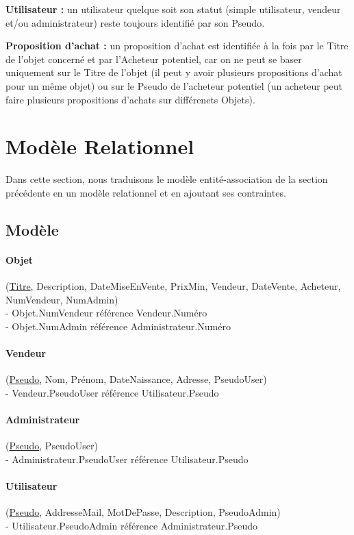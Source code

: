 \documentclass[a4paper,11pt]{article}
\begin{document}
\textbf{Utilisateur :} un utilisateur quelque soit son statut (simple utilisateur, vendeur et/ou administrateur) reste toujours identifié
par son Pseudo.

\textbf{Proposition d'achat :} un proposition d'achat est identifiée à la fois par le Titre de l'objet concerné et par l'Acheteur potentiel,
car on ne peut se baser uniquement sur le Titre de l'objet (il peut y avoir plusieurs propositions d'achat pour un même objet)
ou sur le Pseudo de l'acheteur potentiel (un acheteur peut faire plusieurs propositions d'achats sur différenets Objets).

\section{Modèle Relationnel}
Dans cette section, nous traduisons le modèle entité-association de la section précédente en un modèle relationnel et en ajoutant ses contraintes.

\subsection{Modèle}

\indent

\paragraph{Objet} (\underline{Titre}, Description, DateMiseEnVente, PrixMin, Vendeur, DateVente, Acheteur, NumVendeur, NumAdmin)\\
\indent - Objet.NumVendeur référence Vendeur.Numéro\\
\indent - Objet.NumAdmin référence Administrateur.Numéro


\paragraph{Vendeur} (\underline{Pseudo}, Nom, Prénom, DateNaissance, Adresse, PseudoUser)\\
\indent - Vendeur.PseudoUser référence Utilisateur.Pseudo

\paragraph{Administrateur} (\underline{Pseudo}, PseudoUser)\\
\indent - Administrateur.PseudoUser référence Utilisateur.Pseudo


\paragraph{Utilisateur} (\underline{Pseudo}, AddresseMail, MotDePasse, 
Description, PseudoAdmin)\\
\indent - Utilisateur.PseudoAdmin référence Administrateur.Pseudo
\end{document}
